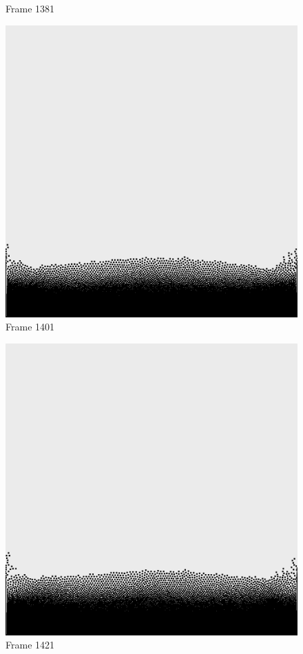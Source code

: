 \documentclass[a4paper, 12pt, oneside]{book}
\begin{document}
\begin{figure}[!ht]
\begin{center}
            Frame 1381
        \end{center}
    \endminipage
    \hfill
        \begin{center}
            \includegraphics[width=\linewidth]{images/test_case_1/1401.png}
            Frame 1401
        \end{center}
    \endminipage
    \hfill
        \begin{center}
            \includegraphics[width=\linewidth]{images/test_case_1/1421.png}
            Frame 1421
        \end{center}
    \endminipage
    \hfill


\end{figure}
\end{document}
